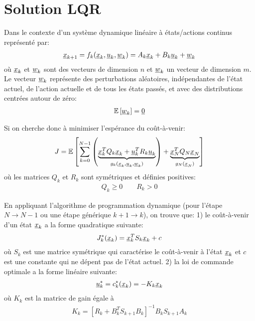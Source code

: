 \newpage
\section{Solution LQR}

Dans le contexte d'un système dynamique linéaire à états/actions continus représenté par:
\begin{align}
    \underline{x}_{k+1} = f_k(\underline{x}_k , \underline{u}_k , \underline{w}_k )  = A_k \underline{x}_k + B_k \underline{u}_k + \underline{w}_k
\end{align}
où $\underline{x}_k$ et $\underline{w}_k$ sont des vecteurs de dimension $n$ et $\underline{w}_k$ un vecteur de dimension $m$. Le vecteur $\underline{w}_k$ représente des perturbations aléatoires, indépendantes de l'état actuel, de l'action actuelle et de tous les états passés, et avec des distributions centrées autour de zéro: 
\begin{align}
    \e{\col{w}_k} = \col{0} %
\end{align}

Si on cherche donc à minimiser l'espérance du coût-à-venir:
\begin{align}
    J = {\mathbb E}\left[  \sum_{k=0}^{N-1} 
    \left(
    \underbrace{
    \underline{x}_k^T Q_k \underline{x}_k + \underline{u}_k^T R_k \underline{u}_k
    }_{ g_k( \underline{x}_k, \underline{u}_k , \underline{w}_k ) }
    \right)
    +
    \underbrace{
    \underline{x}_N^T Q_N \underline{x}_N
    }_{ g_N( \underline{x}_N )  }
     \right]
\end{align}
où les matrices $Q_k$ et $R_k$ sont symétriques et définies positives:
\begin{align}
    Q_k \geq 0 \quad \quad R_k > 0 
\end{align}

En appliquant l'algorithme de programmation dynamique (pour l'étape $N\rightarrow N-1$ ou une étape générique $k+1 \rightarrow k$), on trouve que:
1) le coût-à-venir d'un état $\underline{x}_k$ a la forme quadratique suivante:
\begin{align}
    J_k^*( \underline{x}_k ) = \underline{x}_k^T S_k \underline{x}_k + c
\end{align}
où $S_k$ est une matrice symétrique qui caractérise le coût-à-venir à l'état $\underline{x}_k$ et $c$ est une constante qui ne dépent pas de l'état actuel.
2) la loi de commande optimale a la forme linéaire suivante:
\begin{align}
    \underline{u}_k^* = c_k^*( \underline{x}_k ) = - K_k \underline{x}_k
\end{align}
où $K_k$ est la matrice de gain égale à
\begin{align}
    K_k = \left[ R_k + B_k^T S_{k+1} B_k \right]^{-1} B_k S_{k+1} A_k
\end{align}

